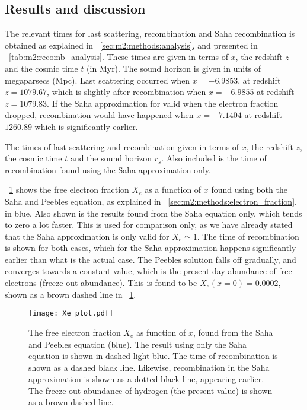 \subsection{Results and discussion}\label{sec:m2:results} 

    The relevant times for last scattering, recombination and Saha recombination is obtained as explained in ~\cref{sec:m2:methods:analysis}, and presented in ~\cref{tab:m2:recomb_analysis}. These times are given in terms of $x$, the redshift $z$ and the cosmic time $t$ (in Myr). The sound horizon is given in units of megaparsecs (Mpc). Last scattering occurred when $x=-6.9853$, at redshift $z=1079.67$, which is slightly after recombination when $x=-6.9855$ at redshift $z=1079.83$. If the Saha approximation for valid when the electron fraction dropped, recombination would have happened when $x=-7.1404$ at redshift $1260.89$ which is significantly earlier. 
    \begin{table}
        
        \caption{The times of last scattering and recombination given in terms of $x$, the redshift $z$, the cosmic time $t$ and the sound horizon $r_s$. Also included is the time of recombination found using the Saha approximation only.}
        \label{tab:m2:recomb_analysis}
    \end{table}

    ~\cref{fig:m2:electron_fraction} shows the free electron fraction $X_e$ as a function of $x$ found using both the Saha and Peebles equation, as explained in ~\cref{sec:m2:methods:electron_fraction}, in blue. Also shown is the results found from the Saha equation only, which tends to zero a lot faster. This is used for comparison only, as we have already stated that the Saha approximation is only valid for $X_e\simeq 1$. The time of recombination is shown for both cases, which for the Saha approximation happens significantly earlier than what is the actual case. The Peebles solution falls off gradually, and converges towards a constant value, which is the present day abundance of free electrons (freeze out abundance). This is found to be $X_e(x=0) = 0.0002$, shown as a brown dashed line in ~\cref{fig:m2:electron_fraction}.
    \begin{figure}
        \texttt{[image: Xe\_plot.pdf]}
        \caption{The free electron fraction $X_e$ as function of $x$, found from the Saha and Peebles equation (blue). The result using only the Saha equation is shown in dashed light blue. The time of recombination is shown as a dashed black line. Likewise, recombination in the Saha approximation is shown as a dotted black line, appearing earlier. The freeze out abundance of hydrogen (the present value) is shown as a brown dashed line.}
        \label{fig:m2:electron_fraction}
    \end{figure}


